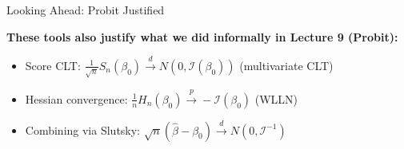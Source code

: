\documentclass[handout, aspectratio=169]{beamer}
\numberwithin{equation}{section}
\begin{document}

\begin{frame}{Looking Ahead: Probit Justified}

\textbf{These tools also justify what we did informally in Lecture 9 (Probit):}
\begin{itemize}
    \item Score CLT: $\frac{1}{\sqrt{n}} S_n(\beta_0) \overset{d}{\to} N(0, \mathcal{I}(\beta_0))$ \quad (multivariate CLT)
    \item Hessian convergence: $\frac{1}{n}H_n(\beta_0) \overset{p}{\to} -\mathcal{I}(\beta_0)$ \quad (WLLN)
    \item Combining via Slutsky: $\sqrt{n}(\hat\beta - \beta_0) \overset{d}{\to} N(0, \mathcal{I}^{-1})$
\end{itemize}

\end{frame}
\end{document}
